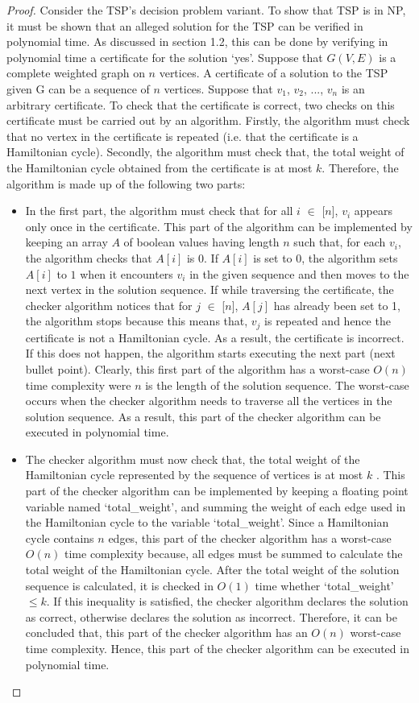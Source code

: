 \documentclass[12pt]{article}
\numberwithin{equation}{subsection}
\numberwithin{table}{subsection}
\begin{document}
\begin{proof}
Consider the TSP's decision problem variant. To show that TSP is in NP, it must be shown that an alleged solution for the TSP can be verified in polynomial time. As discussed in section 1.2, this can be done by verifying in polynomial time a certificate for the solution `yes'. Suppose that $G(V,E)$ is a complete weighted graph on $n$ vertices. A certificate of a solution to the TSP given G can be a sequence of $n$ vertices. Suppose that $v_1$, $v_2$, ..., $v_n$ is an arbitrary certificate. To check that the certificate is correct, two checks on this certificate must be carried out by an algorithm. Firstly, the algorithm must check that no vertex in the certificate is repeated (i.e. that the certificate is a Hamiltonian cycle). Secondly, the algorithm must check that, the total weight of the Hamiltonian cycle obtained from the certificate is at most $k$. Therefore, the algorithm is made up of the following two parts:
\begin{itemize}
   \item In the first part, the algorithm must check that for all $i$ $\in$ [$n$], $v_i$ appears only once in the certificate. This part of the algorithm can be implemented by keeping an array $A$ of boolean values having length $n$ such that, for each $v_i$, the algorithm checks that $A[i]$ is $0$. If $A[i]$ is set to $0$, the algorithm sets $A[i]$ to $1$ when it encounters $v_i$ in the given sequence and then moves to the next vertex in the solution sequence. If while traversing the certificate, the checker algorithm notices that for $j$ $\in$ [$n$], $A[j]$ has already been set to 1, the algorithm stops because this means that, $v_j$ is repeated and hence the certificate is not a Hamiltonian cycle. As a result, the certificate is incorrect. If this does not happen, the algorithm starts executing the next part (next bullet point). Clearly, this first part of the algorithm has a worst-case $O(n)$ time complexity were $n$ is the length of the solution sequence. The worst-case occurs when the checker algorithm needs to traverse all the vertices in the solution sequence. As a result, this part of the checker algorithm can be executed in polynomial time.
   \item The checker algorithm must now check that, the total weight of the Hamiltonian cycle represented by the sequence of vertices is at most $k$ . This part of the checker algorithm can be implemented by keeping a floating point variable named `total\_weight', and summing the weight of each edge used in the Hamiltonian cycle to the variable `total\_weight'. Since a Hamiltonian cycle contains $n$ edges, this part of the checker algorithm has a worst-case $O(n)$ time complexity because, all edges must be summed to calculate the total weight of the Hamiltonian cycle. After the total weight of the solution sequence is calculated, it is checked in $O(1)$ time whether `total\_weight' $\leq k$. If this inequality is satisfied, the checker algorithm declares the solution as correct, otherwise declares the solution as incorrect. Therefore, it can be concluded that, this part of the checker algorithm has an $O(n)$ worst-case time complexity. Hence, this part of the checker algorithm can be executed in polynomial time.

\end{itemize}
\end{proof}
\end{document}
